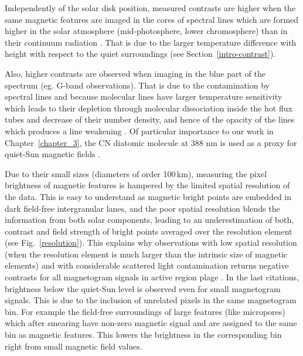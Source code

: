 \documentclass[goettingen, gauss, print]{thesis}
\begin{document}

Independently of the solar disk position, measured contrasts are higher when the same magnetic features are imaged in the cores of spectral lines which are formed higher in the solar atmosphere (mid-photosphere, lower chromosphere) than in their continuum radiation \citep{frazier_multi-channel_1970, title_differences_1992, yeo_intensity_2013}. That is due to the larger temperature difference with height with respect to the quiet surroundings (see Section~\ref{intro-contrast}).

Also, higher contrasts are observed when imaging in the blue part of the spectrum (eg. G-band observations). That is due to the contamination by spectral lines and because molecular lines have larger temperature sensitivity which leads to their depletion through molecular dissociation inside the hot flux tubes and decrease of their number density, and hence of the opacity of the lines which produces a line weakening \citep{berger_new_1995,shelyag_g-band_2004}.
Of particular importance to our work in Chapter~\ref{chapter_3}, the CN diatomic molecule at 388 nm  is used as a proxy for quiet-Sun magnetic fields \citep{zakharov_comparative_2005}.

Due to their small sizes (diameters of order 100\,km), measuring the pixel brightness of magnetic features is hampered by the limited spatial resolution of the data. This is easy to understand as magnetic bright points are embedded in dark field-free intergranular lanes, and the poor spatial resolution blends the information from both solar components, leading to an underestimation of both, contrast and field strength of bright points averaged over the resolution element (see Fig.~\ref{resolution}). This explains why observations with low spatial resolution (when the resolution element is much larger than the intrinsic size of magnetic elements) and with considerable scattered light contamination returns negative contrasts for all magnetogram signals in active region plage \citep{topka_properties_1992, title_differences_1992,topka_properties_1997}. In the last citations, brightness below the quiet-Sun level is observed even for small magnetogram signals. This is due to the inclusion of unrelated pixels in the same magnetogram bin. For example the field-free surroundings of large features (like micropores) which after smearing have non-zero magnetic signal and are assigned to the same bin as magnetic features. This lowers the brightness in the corresponding bin right from small magnetic field values.  
\end{document}
